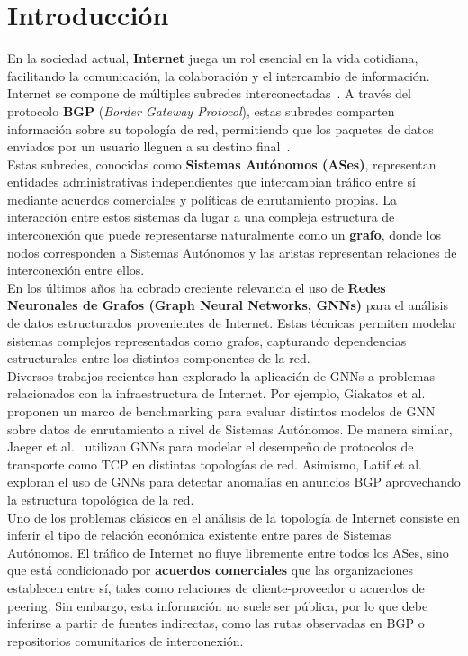 ﻿\chapter{Introducción}

En la sociedad actual, \textbf{Internet} juega un rol esencial en la vida cotidiana, facilitando la comunicación, la colaboración y el intercambio de información. Internet se compone de múltiples subredes interconectadas~\cite{Computer-Networking}. A través del protocolo \textbf{BGP} (\textit{Border Gateway Protocol}), estas subredes comparten información sobre su topología de red, permitiendo que los paquetes de datos enviados por un usuario lleguen a su destino final~\cite{Computer-Networking}.\\

Estas subredes, conocidas como \textbf{Sistemas Autónomos (ASes)}, representan entidades administrativas independientes que intercambian tráfico entre sí mediante acuerdos comerciales y políticas de enrutamiento propias. La interacción entre estos sistemas da lugar a una compleja estructura de interconexión que puede representarse naturalmente como un \textbf{grafo}, donde los nodos corresponden a Sistemas Autónomos y las aristas representan relaciones de interconexión entre ellos.\\

En los últimos años ha cobrado creciente relevancia el uso de \textbf{Redes Neuronales de Grafos (Graph Neural Networks, GNNs)} para el análisis de datos estructurados provenientes de Internet. Estas técnicas permiten modelar sistemas complejos representados como grafos, capturando dependencias estructurales entre los distintos componentes de la red.\\

Diversos trabajos recientes han explorado la aplicación de GNNs a problemas relacionados con la infraestructura de Internet. Por ejemplo, Giakatos et al.~\cite{BenchmarkingGNN} proponen un marco de benchmarking para evaluar distintos modelos de GNN sobre datos de enrutamiento a nivel de Sistemas Autónomos. De manera similar, Jaeger et al.~\cite{ModelingTCPPerformanceGNN} utilizan GNNs para modelar el desempeño de protocolos de transporte como TCP en distintas topologías de red. Asimismo, Latif et al.~\cite{UnveilingPotentialGNNBGP} exploran el uso de GNNs para detectar anomalías en anuncios BGP aprovechando la estructura topológica de la red.\\


Uno de los problemas clásicos en el análisis de la topología de Internet consiste en inferir 
el tipo de relación económica existente entre pares de Sistemas Autónomos. El tráfico de 
Internet no fluye libremente entre todos los ASes, sino que está condicionado por 
\textbf{acuerdos comerciales} que las organizaciones establecen entre sí, tales como 
relaciones de cliente-proveedor o acuerdos de peering. Sin embargo, esta información 
no suele ser pública, por lo que debe inferirse a partir de fuentes indirectas, como 
las rutas observadas en BGP o repositorios comunitarios de interconexión.\\

